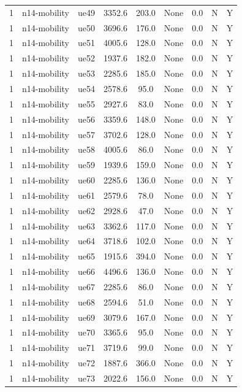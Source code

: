 \begin{table}[ht]
\begin{tabular}{|c|c|c|c|c|c|c|c|c|}
1 & n14-mobility & ue49 & 3352.6 & 203.0 & None & 0.0 & N & Y \\
1 & n14-mobility & ue50 & 3696.6 & 176.0 & None & 0.0 & N & Y \\
1 & n14-mobility & ue51 & 4005.6 & 128.0 & None & 0.0 & N & Y \\
1 & n14-mobility & ue52 & 1937.6 & 182.0 & None & 0.0 & N & Y \\
1 & n14-mobility & ue53 & 2285.6 & 185.0 & None & 0.0 & N & Y \\
1 & n14-mobility & ue54 & 2578.6 & 95.0 & None & 0.0 & N & Y \\
1 & n14-mobility & ue55 & 2927.6 & 83.0 & None & 0.0 & N & Y \\
1 & n14-mobility & ue56 & 3359.6 & 148.0 & None & 0.0 & N & Y \\
1 & n14-mobility & ue57 & 3702.6 & 128.0 & None & 0.0 & N & Y \\
1 & n14-mobility & ue58 & 4005.6 & 86.0 & None & 0.0 & N & Y \\
1 & n14-mobility & ue59 & 1939.6 & 159.0 & None & 0.0 & N & Y \\
1 & n14-mobility & ue60 & 2285.6 & 136.0 & None & 0.0 & N & Y \\
1 & n14-mobility & ue61 & 2579.6 & 78.0 & None & 0.0 & N & Y \\
1 & n14-mobility & ue62 & 2928.6 & 47.0 & None & 0.0 & N & Y \\
1 & n14-mobility & ue63 & 3362.6 & 117.0 & None & 0.0 & N & Y \\
1 & n14-mobility & ue64 & 3718.6 & 102.0 & None & 0.0 & N & Y \\
1 & n14-mobility & ue65 & 1915.6 & 394.0 & None & 0.0 & N & Y \\
1 & n14-mobility & ue66 & 4496.6 & 136.0 & None & 0.0 & N & Y \\
1 & n14-mobility & ue67 & 2285.6 & 86.0 & None & 0.0 & N & Y \\
1 & n14-mobility & ue68 & 2594.6 & 51.0 & None & 0.0 & N & Y \\
1 & n14-mobility & ue69 & 3079.6 & 167.0 & None & 0.0 & N & Y \\
1 & n14-mobility & ue70 & 3365.6 & 95.0 & None & 0.0 & N & Y \\
1 & n14-mobility & ue71 & 3719.6 & 99.0 & None & 0.0 & N & Y \\
1 & n14-mobility & ue72 & 1887.6 & 366.0 & None & 0.0 & N & Y \\
1 & n14-mobility & ue73 & 2022.6 & 156.0 & None & 0.0 & N & Y \\

\end{tabular}
\end{table}
